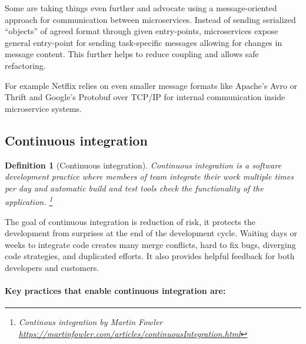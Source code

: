 \documentclass[12pt,oneside]{fithesis2}
\newtheorem{definition}{Definition}
\begin{document}
Some are taking things even further and advocate using a message-oriented approach for communication between microservices. Instead of sending serialized “objects” of agreed format through given entry-points, microservices expose general entry-point for sending task-specific messages allowing for changes in message content. This further helps to reduce coupling and allows safe refactoring.

For example Netflix relies on even smaller message formats like Apache's Avro or Thrift and Google's Protobuf over TCP/IP for internal communication inside microservice systems. \cite{ma}

\subsection{Continuous integration}

\begin{definition}[Continuous integration]
Continuous integration is a software development practice where members of team integrate their work multiple times per day and automatic build and test tools check the functionality of the application. \footnote{Continous integration by Martin Fowler \url{https://martinfowler.com/articles/continuousIntegration.html}}
\end{definition}

The goal of continuous integration is reduction of risk, it protects the development from surprises at the end of the development cycle. Waiting days or weeks to integrate code creates many merge conflicts, hard to fix bugs, diverging code strategies, and duplicated efforts. It also provides helpful feedback for both developers and customers.

\paragraph {Key practices that enable continuous integration are:}
\end{document}
